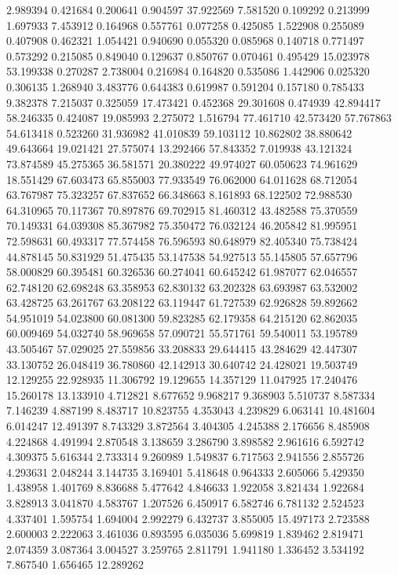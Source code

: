 2.989394
0.421684
0.200641
0.904597
37.922569
7.581520
0.109292
0.213999
1.697933
7.453912
0.164968
0.557761
0.077258
0.425085
1.522908
0.255089
0.407908
0.462321
1.054421
0.940690
0.055320
0.085968
0.140718
0.771497
0.573292
0.215085
0.849040
0.129637
0.850767
0.070461
0.495429
15.023978
53.199338
0.270287
2.738004
0.216984
0.164820
0.535086
1.442906
0.025320
0.306135
1.268940
3.483776
0.644383
0.619987
0.591204
0.157180
0.785433
9.382378
7.215037
0.325059
17.473421
0.452368
29.301608
0.474939
42.894417
58.246335
0.424087
19.085993
2.275072
1.516794
77.461710
42.573420
57.767863
54.613418
0.523260
31.936982
41.010839
59.103112
10.862802
38.880642
49.643664
19.021421
27.575074
13.292466
57.843352
7.019938
43.121324
73.874589
45.275365
36.581571
20.380222
49.974027
60.050623
74.961629
18.551429
67.603473
65.855003
77.933549
76.062000
64.011628
68.712054
63.767987
75.323257
67.837652
66.348663
8.161893
68.122502
72.988530
64.310965
70.117367
70.897876
69.702915
81.460312
43.482588
75.370559
70.149331
64.039308
85.367982
75.350472
76.032124
46.205842
81.995951
72.598631
60.493317
77.574458
76.596593
80.648979
82.405340
75.738424
44.878145
50.831929
51.475435
53.147538
54.927513
55.145805
57.657796
58.000829
60.395481
60.326536
60.274041
60.645242
61.987077
62.046557
62.748120
62.698248
63.358953
62.830132
63.202328
63.693987
63.532002
63.428725
63.261767
63.208122
63.119447
61.727539
62.926828
59.892662
54.951019
54.023800
60.081300
59.823285
62.179358
64.215120
62.862035
60.009469
54.032740
58.969658
57.090721
55.571761
59.540011
53.195789
43.505467
57.029025
27.559856
33.208833
29.644415
43.284629
42.447307
33.130752
26.048419
36.780860
42.142913
30.640742
24.428021
19.503749
12.129255
22.928935
11.306792
19.129655
14.357129
11.047925
17.240476
15.260178
13.133910
4.712821
8.677652
9.968217
9.368903
5.510737
8.587334
7.146239
4.887199
8.483717
10.823755
4.353043
4.239829
6.063141
10.481604
6.014247
12.491397
8.743329
3.872564
3.404305
4.245388
2.176656
8.485908
4.224868
4.491994
2.870548
3.138659
3.286790
3.898582
2.961616
6.592742
4.309375
5.616344
2.733314
9.260989
1.549837
6.717563
2.941556
2.855726
4.293631
2.048244
3.144735
3.169401
5.418648
0.964333
2.605066
5.429350
1.438958
1.401769
8.836688
5.477642
4.846633
1.922058
3.821434
1.922684
3.828913
3.041870
4.583767
1.207526
6.450917
6.582746
6.781132
2.524523
4.337401
1.595754
1.694004
2.992279
6.432737
3.855005
15.497173
2.723588
2.600003
2.222063
3.461036
0.893595
6.035036
5.699819
1.839462
2.819471
2.074359
3.087364
3.004527
3.259765
2.811791
1.941180
1.336452
3.534192
7.867540
1.656465
12.289262
